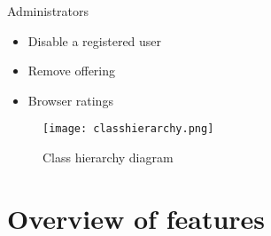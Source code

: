 \documentclass[a4paper]{report}
\begin{document}
Administrators
\begin{itemize}
	\item Disable a registered user
	\item Remove offering
	\item Browser ratings
\end{itemize}

\begin{figure}[htp]
\centering
\texttt{[image: classhierarchy.png]}
\caption{Class hierarchy diagram}
\label{fig:classhierarchy}
\end{figure}



\chapter{}


\chapter{Overview of features}
\end{document}
